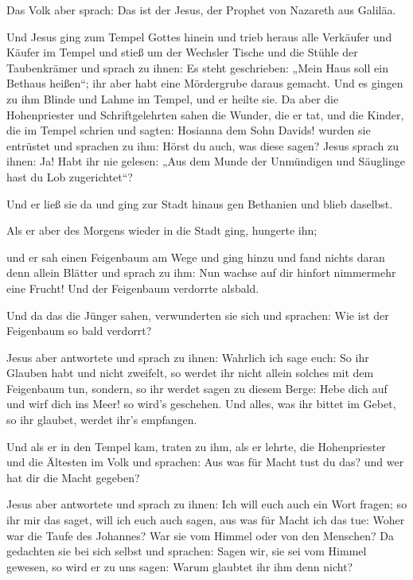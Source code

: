  Das Volk aber sprach: Das ist der Jesus, der Prophet von
Nazareth aus Galiläa.

 Und Jesus ging zum Tempel Gottes hinein und trieb heraus
alle Verkäufer und Käufer im Tempel und stieß um der Wechsler Tische und
die Stühle der Taubenkrämer  und sprach zu ihnen: Es
steht geschrieben: „Mein Haus soll ein Bethaus heißen``; ihr aber habt
eine Mördergrube daraus gemacht.  Und es gingen zu ihm
Blinde und Lahme im Tempel, und er heilte sie.  Da aber
die Hohenpriester und Schriftgelehrten sahen die Wunder, die er tat, und
die Kinder, die im Tempel schrien und sagten: Hosianna dem Sohn Davids!
wurden sie entrüstet  und sprachen zu ihm: Hörst du auch,
was diese sagen? Jesus sprach zu ihnen: Ja! Habt ihr nie gelesen: „Aus
dem Munde der Unmündigen und Säuglinge hast du Lob zugerichtet``?

 Und er ließ sie da und ging zur Stadt hinaus gen
Bethanien und blieb daselbst.

 Als er aber des Morgens wieder in die Stadt ging,
hungerte ihn;

 und er sah einen Feigenbaum am Wege und ging hinzu und
fand nichts daran denn allein Blätter und sprach zu ihm: Nun wachse auf
dir hinfort nimmermehr eine Frucht! Und der Feigenbaum verdorrte
alsbald.

 Und da das die Jünger sahen, verwunderten sie sich und
sprachen: Wie ist der Feigenbaum so bald verdorrt?

 Jesus aber antwortete und sprach zu ihnen: Wahrlich ich
sage euch: So ihr Glauben habt und nicht zweifelt, so werdet ihr nicht
allein solches mit dem Feigenbaum tun, sondern, so ihr werdet sagen zu
diesem Berge: Hebe dich auf und wirf dich ins Meer! so wird's geschehen.
 Und alles, was ihr bittet im Gebet, so ihr glaubet,
werdet ihr's empfangen.

 Und als er in den Tempel kam, traten zu ihm, als er
lehrte, die Hohenpriester und die Ältesten im Volk und sprachen: Aus was
für Macht tust du das? und wer hat dir die Macht gegeben?

 Jesus aber antwortete und sprach zu ihnen: Ich will euch
auch ein Wort fragen; so ihr mir das saget, will ich euch auch sagen,
aus was für Macht ich das tue:  Woher war die Taufe des
Johannes? War sie vom Himmel oder von den Menschen? Da gedachten sie bei
sich selbst und sprachen: Sagen wir, sie sei vom Himmel gewesen, so wird
er zu uns sagen: Warum glaubtet ihr ihm denn nicht?

